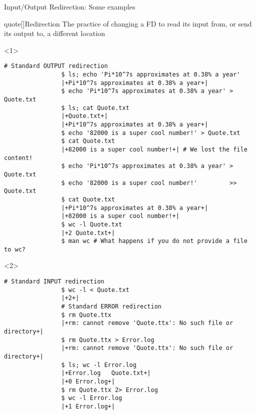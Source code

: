 \begin{frame}[fragile]{Input/Output Redirection: Some examples}
    \vspace{-8mm}
    \begin{overlayarea}{\textwidth}{0.7\textheight}
        \begin{varblock}{quote}[\textwidth]{Redirection}
            \normalsize\textnormal{The practice of changing a FD to read its input from, or send its output to, a different location}
        \end{varblock}
        \begin{onlyenv}<1>
            \begin{lstlisting}[style=MyBash, aboveskip=2mm]
                # Standard OUTPUT redirection
                $ ls; echo 'Pi*10^7s approximates at 0.38% a year'
                |+Pi*10^7s approximates at 0.38% a year+|
                $ echo 'Pi*10^7s approximates at 0.38% a year' > Quote.txt
                $ ls; cat Quote.txt
                |+Quote.txt+|
                |+Pi*10^7s approximates at 0.38% a year+|
                $ echo '82000 is a super cool number!' > Quote.txt
                $ cat Quote.txt
                |+82000 is a super cool number!+| # We lost the file content!
                $ echo 'Pi*10^7s approximates at 0.38% a year' >  Quote.txt
                $ echo '82000 is a super cool number!'         >> Quote.txt
                $ cat Quote.txt
                |+Pi*10^7s approximates at 0.38% a year+|
                |+82000 is a super cool number!+|
                $ wc -l Quote.txt
                |+2 Quote.txt+|
                $ man wc # What happens if you do not provide a file to wc?
            \end{lstlisting}
        \end{onlyenv}
        \begin{onlyenv}<2>
            \begin{lstlisting}[style=MyBash, aboveskip=2mm, firstnumber=19]
                # Standard INPUT redirection
                $ wc -l < Quote.txt
                |+2+|
                # Standard ERROR redirection
                $ rm Quote.ttx
                |+rm: cannot remove 'Quote.ttx': No such file or directory+|
                $ rm Quote.ttx > Error.log
                |+rm: cannot remove 'Quote.ttx': No such file or directory+|
                $ ls; wc -l Error.log
                |+Error.log   Quote.txt+|
                |+0 Error.log+|
                $ rm Quote.ttx 2> Error.log
                $ wc -l Error.log
                |+1 Error.log+|

\end{lstlisting}
\end{onlyenv}
\end{overlayarea}
\end{frame}
